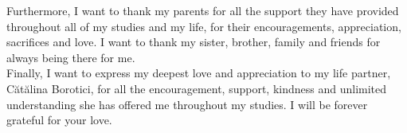 Furthermore, I want to thank my parents for all the support they have provided throughout all of my studies and my life, for their encouragements, appreciation, sacrifices and love. I want to thank my sister, brother, family and friends for always being there for me.\\

Finally, I want to express my deepest love and appreciation to my life partner, C\u at\u alina Borotici, for all the encouragement, support, kindness and unlimited understanding she has offered me throughout my studies. I will be forever grateful for your love.

\bigskip



\endgroup



